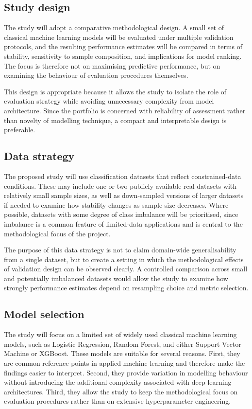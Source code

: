 \documentclass[11pt,a4paper]{article}
\begin{document}
\subsection{Study design}

The study will adopt a comparative methodological design. A small set of classical machine learning models will be evaluated under multiple validation protocols, and the resulting performance estimates will be compared in terms of stability, sensitivity to sample composition, and implications for model ranking. The focus is therefore not on maximising predictive performance, but on examining the behaviour of evaluation procedures themselves.

This design is appropriate because it allows the study to isolate the role of evaluation strategy while avoiding unnecessary complexity from model architecture. Since the portfolio is concerned with reliability of assessment rather than novelty of modelling technique, a compact and interpretable design is preferable.

\subsection{Data strategy}

The proposed study will use classification datasets that reflect constrained-data conditions. These may include one or two publicly available real datasets with relatively small sample sizes, as well as down-sampled versions of larger datasets if needed to examine how stability changes as sample size decreases. Where possible, datasets with some degree of class imbalance will be prioritised, since imbalance is a common feature of limited-data applications and is central to the methodological focus of the project.

The purpose of this data strategy is not to claim domain-wide generalisability from a single dataset, but to create a setting in which the methodological effects of validation design can be observed clearly. A controlled comparison across small and potentially imbalanced datasets would allow the study to examine how strongly performance estimates depend on resampling choice and metric selection.

\subsection{Model selection}

The study will focus on a limited set of widely used classical machine learning models, such as Logistic Regression, Random Forest, and either Support Vector Machine or XGBoost. These models are suitable for several reasons. First, they are common reference points in applied machine learning and therefore make the findings easier to interpret. Second, they provide variation in modelling behaviour without introducing the additional complexity associated with deep learning architectures. Third, they allow the study to keep the methodological focus on evaluation procedures rather than on extensive hyperparameter engineering.
\end{document}
